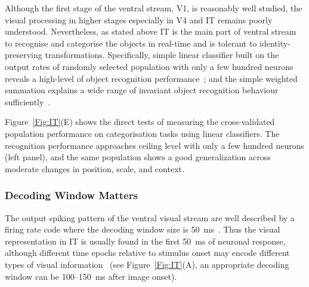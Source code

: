 Although the first stage of the ventral stream, V1, is reasonably well studied, the visual processing in higher stages especially in V4 and IT remains poorly understood.
Nevertheless, as stated above IT is the main part of ventral stream to recognise and categorise the objects in real-time and is tolerant to identity-preserving transformations.
Specifically, simple linear classifier built on the output rates of randomly selected population with only a few hundred neurons reveals a high-level of object recognition performance~\cite{hung2005fast};
and the simple weighted summation explains a wide range of invariant object recognition behaviour sufficiently~\cite{majaj2012unified}.

Figure~\ref{Fig:IT}(E) shows the direct tests of measuring the cross-validated population performance on categorisation tasks using linear classifiers.
The recognition performance approaches ceiling level with only a few hundred neurons (left panel), and the same population shows a good generalization across moderate changes in position, scale, and context.
\subsubsection{Decoding Window Matters}
The output spiking pattern of the ventral visual stream are well described by a firing rate code where the decoding window size is 50~ms~\cite{hung2005fast}.
Thus the visual representation in IT is usually found in the first 50~ms of neuronal response, although different time epochs relative to stimulus onset may encode different types of visual information~\cite{brincat2006dynamic} (see Figure~\ref{Fig:IT}(A), an appropriate decoding window can be 100–150~ms after image onset).





